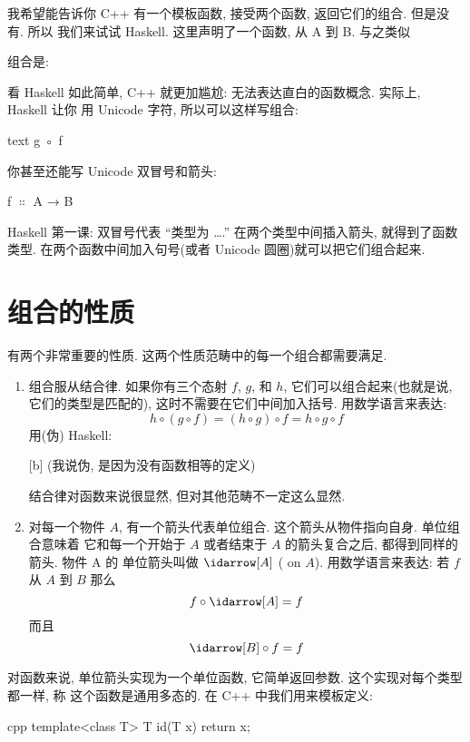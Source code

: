我希望能告诉你 C++ 有一个模板函数, 接受两个函数, 返回它们的组合. 但是没有. 所以
我们来试试 Haskell. 这里声明了一个函数, 从 A 到 B.
与之类似

组合是:

看 Haskell 如此简单, C++ 就更加尴尬: 无法表达直白的函数概念. 实际上, Haskell 让你
用 Unicode 字符, 所以可以这样写组合:
\begin{snip}{text}
g ◦ f
\end{snip}

你甚至还能写 Unicode 双冒号和箭头:
\begin{snipv}
f \ensuremath{\Colon} A → B
\end{snipv}

Haskell 第一课: 双冒号代表 ``类型为 \ldots{}.'' 在两个类型中间插入箭头, 就得到了函数
类型. 在两个函数中间加入句号(或者 Unicode 圆圈)就可以把它们组合起来.

\section{组合的性质}

有两个非常重要的性质. 这两个性质范畴中的每一个组合都需要满足.
\begin{enumerate}
  \item
        组合服从结合律. 如果你有三个态射 $f$, $g$, 和 $h$, 它们可以组合起来(也就是说,
        它们的类型是匹配的), 这时不需要在它们中间加入括号. 用数学语言来表达:
        \[h \circ (g \circ f) = (h \circ g) \circ f = h \circ g \circ f\]
        用(伪) Haskell:

        [b]
        (我说伪, 是因为没有函数相等的定义)

        结合律对函数来说很显然, 但对其他范畴不一定这么显然.

        \item
        对每一个物件 $A$, 有一个箭头代表单位组合. 这个箭头从物件指向自身. 单位组合意味着
        它和每一个开始于 $A$ 或者结束于 $A$ 的箭头复合之后, 都得到同样的箭头. 物件 A 的
        单位箭头叫做 $\idarrow[A]$ ( on $A$). 用数学语言来表达:
        若 $f$ 从 $A$ 到 $B$ 那么
        \[f \circ \idarrow[A] = f\]
        而且
        \[\idarrow[B] \circ f = f\]
\end{enumerate}

对函数来说, 单位箭头实现为一个单位函数, 它简单返回参数. 这个实现对每个类型都一样, 称
这个函数是通用多态的. 在 C++ 中我们用来模板定义:

\begin{snip}{cpp}
template<class T> T id(T x) { return x; }
\end{snip}

